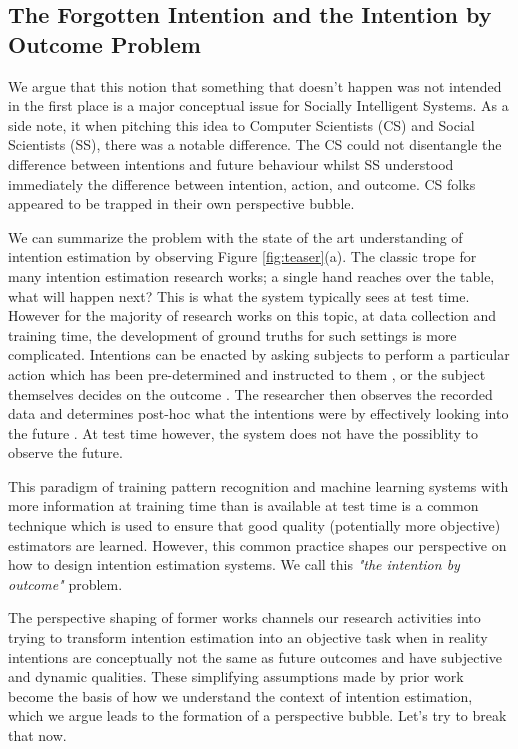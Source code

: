 \documentclass[sigconf]{acmart}
\begin{document}
\subsection{The Forgotten Intention and the Intention by Outcome Problem}
\label{sec:intentoutcomeproblem}
We argue that this notion that something that doesn't happen was not intended in the first place is a major conceptual issue for Socially Intelligent Systems. As a side note, it when pitching this idea to Computer Scientists (CS) and Social Scientists (SS), there was a notable difference. The CS could not disentangle the difference between intentions and future behaviour whilst SS understood immediately the difference between intention, action, and outcome. CS folks appeared to be trapped in their own perspective bubble. 

We can summarize the problem with the state of the art understanding of intention estimation by observing Figure \ref{fig:teaser}(a). The classic trope for many intention estimation research works; a single hand reaches over the table, what will happen next? This is what the system typically sees at test time. However for the majority of research works on this topic, at data collection and training time, the development of ground truths for such settings is more complicated. Intentions can be enacted by asking subjects to perform a particular action which has been pre-determined and instructed to them \cite{10.1007/s11263-018-1104-4}, or the subject themselves decides on the outcome \cite{Huang2015}. The researcher then observes the recorded data and determines post-hoc what the intentions were by effectively looking into the future \cite{objectpicking2021,Huang2015}. At test time however, the system does not have the possiblity to observe the future. 

This paradigm of training pattern recognition and machine learning systems with more information at training time than is available at test time is a common technique which is used to ensure that good quality (potentially more objective) estimators are learned. However, this common practice shapes our perspective on how to design intention estimation systems. We call this \emph{"the intention by outcome"} problem.

The perspective shaping of former works channels our research activities into trying to transform intention estimation into an objective task when in reality intentions are conceptually not the same as future outcomes and have subjective and dynamic qualities. These simplifying assumptions made by prior work become the basis of how we understand the context of intention estimation, which we argue leads to the formation of a perspective bubble. Let's try to break that now. 
\end{document}
